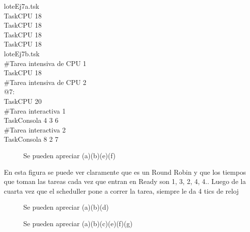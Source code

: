 loteEj7a.tsk\\
TaskCPU 18\\
TaskCPU 18\\
TaskCPU 18\\
TaskCPU 18\\


loteEj7b.tsk\\
\#Tarea intensiva de CPU 1\\
TaskCPU 18\\
\#Tarea intensiva de CPU 2\\
@7:\\
TaskCPU 20\\
\#Tarea interactiva 1\\
TaskConsola 4 3 6\\
\#Tarea interactiva 2\\
TaskConsola 8 2 7 \\





\begin{figure}[H]
  \centering
  \caption{Se pueden apreciar (a)(b)(e)(f)}
  \label{fig:ej7a}
\end{figure}

En esta figura se puede ver claramente que es un Round Robin y que los tiempos que toman las tareas cada vez que entran en Ready son 1, 3, 2, 4, 4.. Luego de la cuarta vez que el scheduller pone a correr la tarea, siempre le da 4 tics de reloj


\begin{figure}[H]
  \centering
  \caption{Se pueden apreciar (a)(b)(d)}
  \label{fig:test2ej7}
\end{figure}


\begin{figure}[H]
  \centering
  \caption{Se pueden apreciar (a)(b)(c)(e)(f)(g)}
  \label{fig:test3ej7}
\end{figure}
